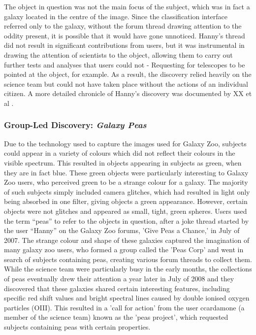 \documentclass{sigchi}
\begin{document}
The object in question was not the main focus of the subject, which was in fact a galaxy located in the centre of the image. Since the classification interface referred only to the galaxy, without the forum thread drawing attention to the oddity present, it is possible that it would have gone unnoticed. Hanny's thread did not result in significant contributions from users, but it was instrumental in drawing the attention of scientists to the object, allowing them to carry out further tests and analyses that users could not - Requesting for telescopes to be pointed at the object, for example. As a result, the discovery relied heavily on the science team but could not have taken place without the actions of an individual citizen. A more detailed chronicle of Hanny's discovery was documented by XX et al \cite{}.

\subsubsection{Group-Led Discovery: \emph{Galaxy Peas}}
Due to the technology used to capture the images used for Galaxy Zoo, subjects could appear in a variety of colours which did not reflect their colours in the visible spectrum. This resulted in objects appearing in subjects as green, when they are in fact blue. These green objects were particularly interesting to Galaxy Zoo users, who perceived green to be a strange colour for a galaxy.  The majority of such subjects simply included camera glitches, which had resulted in light only being absorbed in one filter, giving objects a green appearance. However, certain objects were not glitches and appeared as small, tight, green spheres. Users used the term “peas” to refer to the objects in question, after a joke thread started by the user “Hanny” on the Galaxy Zoo forums, 'Give Peas a Chance,' in July of 2007. The strange colour and shape of these galaxies captured the imagination of many galaxy zoo users, who formed a group called the 'Peas Corp' and went in search of subjects containing peas, creating various forum threads to collect them. While the science team were particularly busy in the early months, the collections of peas eventually drew their attention a year later in July of 2008 and they discovered that these galaxies shared  certain interesting features, including specific red shift values and bright spectral lines caused by double ionised oxygen particles (OIII). This resulted in a 'call for action' from the user ccardamone (a member of the science team) known as the 'peas project', which requested subjects containing peas with certain properties.
\end{document}

